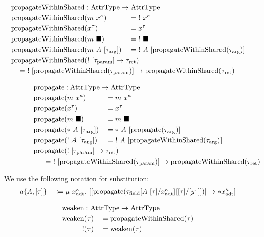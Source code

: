 \newcommand{\propagateWithinShared}{\mathrm{propagateWithinShared}}

\begin{alignat*}{3}
  \propagateWithinShared &: \mathrlap{\AttrType \to \AttrType} \\
  \propagateWithinShared&(m\ x^\kappa) &&=\ !\ x^\kappa \\
  \propagateWithinShared&(x^\tau) &&= x^\tau \\
  \propagateWithinShared&(m\ \blacksquare) &&=\ !\ \blacksquare \\
  \propagateWithinShared&(m\ A\ [\tau_\arrg]) &&=\ !\ A\ [\propagateWithinShared(\tau_\arrg)] \\
  \propagateWithinShared&\mathrlap{(!\ [\tau_\param] \to \tau_\ret)} \\
  \mathclap{\hspace{12em}= \ !\ [\propagateWithinShared(\tau_\param)] \to \propagateWithinShared(\tau_\ret)}
\end{alignat*}

\newcommand{\propagate}{\mathrm{propagate}}

\begin{alignat*}{3}
  \propagate &: \mathrlap{\AttrType \to \AttrType} \\
  \propagate&(m\ x^\kappa) &&= m\ x^\kappa \\
  \propagate&(x^\tau) &&= x^\tau \\
  \propagate&(m\ \blacksquare) &&= m\ \blacksquare \\
  \propagate&(*\ A\ [\tau_\arrg]) &&= *\ A\ [\propagate(\tau_\arrg)] \\
  \propagate&(!\ A\ [\tau_\arrg]) &&= \ !\ A\ [\propagateWithinShared(\tau_\arrg)] \\
  \propagate&\mathrlap{(!\ [\tau_\param] \to \tau_\ret)} \\
  \mathclap{\hspace{25em}= \ !\ [\propagateWithinShared(\tau_\param)] \to \propagateWithinShared(\tau_\ret)}
\end{alignat*}

We use the following notation for substitution:
\begin{alignat*}{3}
  a\{A, [\tau]\}\ &&\coloneqq&\ \mu\ x^\kappa_\adt.\ [[\propagate(\tau_\field[A\ [\tau]/x^\kappa_\adt][[\tau]/[y^\tau]])] \to *x^\kappa_\adt]
\end{alignat*}

\newcommand{\weaken}{\mathrm{weaken}}

\begin{alignat*}{3}
  \weaken &: \mathrlap{\AttrType \to \AttrType} \\
  \weaken&(\tau) &&= \propagateWithinShared(\tau) \\
  !&(\tau) &&= \weaken(\tau)
\end{alignat*}

